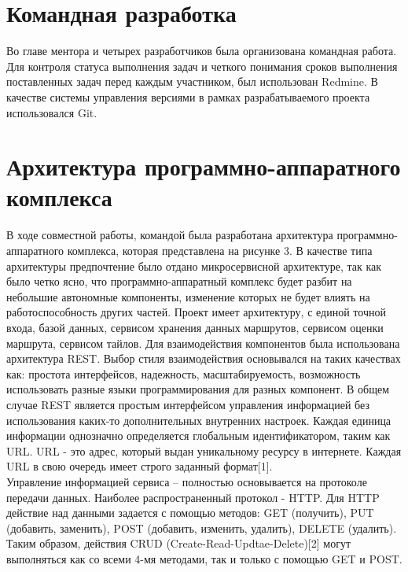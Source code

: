 \documentclass[a4paper, 10pt]{article}
\begin{document}
	\section{Командная разработка}
	\hspace*{5mm} Во главе ментора и четырех разработчиков была организована командная работа. Для контроля статуса выполнения задач и четкого понимания сроков выполнения поставленных задач перед каждым участником, был использован Redmine. В качестве системы управления версиями в рамках разрабатываемого проекта использовался Git.   
	\section{Архитектура программно-аппаратного комплекса} 
	\hspace*{5mm} В ходе совместной работы, командой была разработана архитектура программно-аппаратного комплекса, которая представлена на рисунке 3. В качестве типа архитектуры предпочтение было отдано микросервисной архитектуре, так как было четко ясно, что программно-аппаратный комплекс будет разбит на небольшие автономные компоненты, изменение которых не будет влиять на работоспособность других частей. Проект имеет архитектуру, с единой точной входа, базой данных, сервисом хранения данных маршрутов, сервисом оценки маршрута, сервисом тайлов. Для взаимодействия компонентов была использована архитектура REST. Выбор стиля взаимодействия основывался на таких качествах как: простота интерфейсов, надежность, масштабируемость, возможность использовать разные языки программирования для разных компонент. В общем случае REST является простым интерфейсом управления информацией без использования каких-то дополнительных внутренних настроек. Каждая единица информации однозначно определяется глобальным идентификатором, таким как URL. URL - это адрес, который выдан уникальному ресурсу в интернете. Каждая URL в свою очередь имеет строго заданный формат[1]. 
	\\ \hspace*{5mm} Управление информацией сервиса – полностью основывается на протоколе передачи данных. Наиболее распространенный протокол - HTTP. Для HTTP действие над данными задается с помощью методов: GET (получить), PUT (добавить, заменить), POST (добавить, изменить, удалить), DELETE (удалить). Таким образом, действия CRUD (Create-Read-Updtae-Delete)[2] могут выполняться как со всеми 4-мя методами, так и только с помощью GET и POST.
	\clearpage
	\newpage
\end{document}
